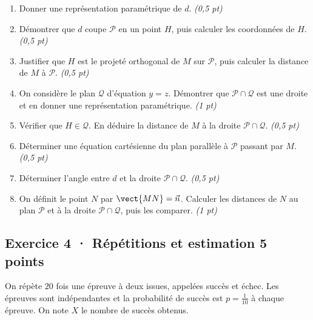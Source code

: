 \begin{enumerate}

\item Donner une représentation paramétrique de $d$. \hfill\textit{(0,5 pt)}

\item Démontrer que $d$ coupe $\mathcal P$ en un point $H$, puis calculer les coordonnées de $H$. \hfill\textit{(0,5 pt)}

\item Justifier que $H$ est le projeté orthogonal de $M$ sur $\mathcal P$, puis calculer la distance de $M$ à $\mathcal P$. \hfill\textit{(0,5 pt)}

\item On considère le plan $\mathcal Q$ d'équation $y=z$. Démontrer que $\mathcal P\cap\mathcal Q$ est une droite et en donner une représentation paramétrique. \hfill\textit{(1 pt)}

\item Vérifier que $H\in\mathcal Q$. En déduire la distance de $M$ à la droite $\mathcal P\cap\mathcal Q$. \hfill\textit{(0,5 pt)}

\item Déterminer une équation cartésienne du plan parallèle à $\mathcal P$ passant par $M$. \hfill\textit{(0,5 pt)}

\item Déterminer l'angle entre $d$ et la droite $\mathcal P\cap\mathcal Q$. \hfill\textit{(0,5 pt)}

\item On définit le point $N$ par $\vect{MN}=\vec n$. Calculer les distances de $N$ au plan $\mathcal P$ et à la droite $\mathcal P\cap\mathcal Q$, puis les comparer. \hfill\textit{(1 pt)}

\end{enumerate}

\subsection*{Exercice 4 · Répétitions et estimation \hfill 5 points}On répète $20$ fois une épreuve à deux issues, appelées succès et échec. Les épreuves sont indépendantes et la probabilité de succès est $p=\frac{1}{10}$ à chaque épreuve. On note $X$ le nombre de succès obtenus.


